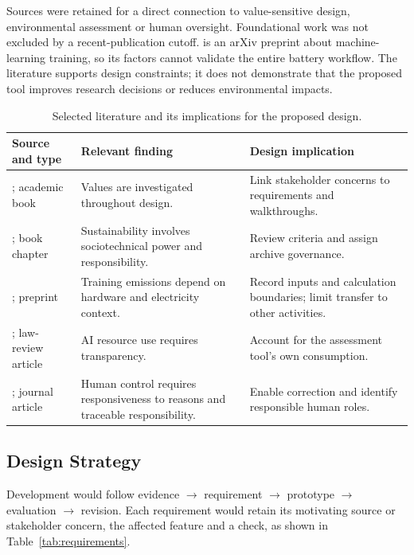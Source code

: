 \documentclass[11pt,a4paper]{article}
\begin{document}
Sources were retained for a direct connection to value-sensitive design, environmental assessment or human oversight. Foundational work was not excluded by a recent-publication cutoff. \citet{lacoste2019carbon} is an arXiv preprint about machine-learning training, so its factors cannot validate the entire battery workflow. The literature supports design constraints; it does not demonstrate that the proposed tool improves research decisions or reduces environmental impacts.

\begin{table}[!htbp]
\centering\small
\begin{tabularx}{\textwidth}{@{}>{\raggedright\arraybackslash}p{}>{\raggedright\arraybackslash}X>{\raggedright\arraybackslash}X@{}}
\toprule
Source and type & Relevant finding & Design implication \\
\midrule
\citet{friedman2019shaping}; academic book & Values are investigated throughout design. & Link stakeholder concerns to requirements and walkthroughs. \\
\midrule
\citet{hasselbalch2025sustainability}; book chapter & Sustainability involves sociotechnical power and responsibility. & Review criteria and assign archive governance. \\
\midrule
\citet{lacoste2019carbon}; preprint & Training emissions depend on hardware and electricity context. & Record inputs and calculation boundaries; limit transfer to other activities. \\
\midrule
\citet{lin2023cost}; law-review article & AI resource use requires transparency. & Account for the assessment tool's own consumption. \\
\midrule
\citet{santoni2018control}; journal article & Human control requires responsiveness to reasons and traceable responsibility. & Enable correction and identify responsible human roles. \\
\bottomrule
\end{tabularx}
\caption{Selected literature and its implications for the proposed design.}
\label{tab:literature}
\end{table}

\FloatBarrier
\subsection{Design Strategy}
Development would follow evidence $\rightarrow$ requirement $\rightarrow$ prototype $\rightarrow$ evaluation $\rightarrow$ revision. Each requirement would retain its motivating source or stakeholder concern, the affected feature and a check, as shown in Table~\ref{tab:requirements}.
\end{document}

